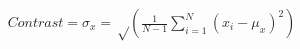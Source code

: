 \documentclass[preview]{standalone}
\begin{document}
\begin{align*}
Contrast = \sigma_x = \sqrt\left(\frac{1}{N-1}\sum_{i=1}^{N}(x_i - \mu_x)^2\right)
\end{align*}
\end{document}
